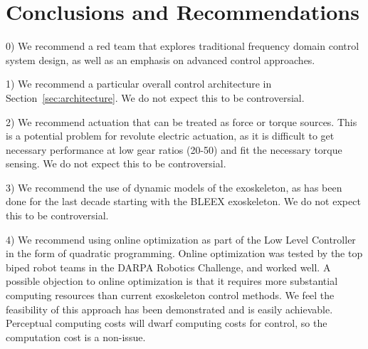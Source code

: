 \documentclass[letterpaper,12pt,fullpage]{article}
\begin{document}

\section{Conclusions and Recommendations}

0) We recommend a red team that explores traditional 
frequency domain control system
design, as well as an emphasis on advanced control approaches.

1) We recommend a particular overall control 
architecture in Section~\ref{sec:architecture}.
We do not expect this to be controversial.

2) We recommend actuation that can be treated as force or torque sources.
This is a potential problem for revolute electric actuation, as it
is difficult to get necessary performance at low gear ratios (20-50)
and fit the necessary torque sensing.
We do not expect this to be controversial.

3) We recommend the use of dynamic models of the exoskeleton, as has been done
for the last decade starting with the BLEEX exoskeleton.
We do not expect this to be controversial.

4) We recommend using online optimization as part of the Low Level Controller
in the form of quadratic programming. Online optimization
was tested by the top biped robot
teams in the DARPA Robotics Challenge, and worked well.
A possible objection to online optimization
is that it requires more substantial computing
resources than current exoskeleton control methods. We feel the feasibility
of this approach has been demonstrated and is easily achievable. Perceptual
computing costs will dwarf computing costs for control, 
so the computation cost is a non-issue.
\end{document}

